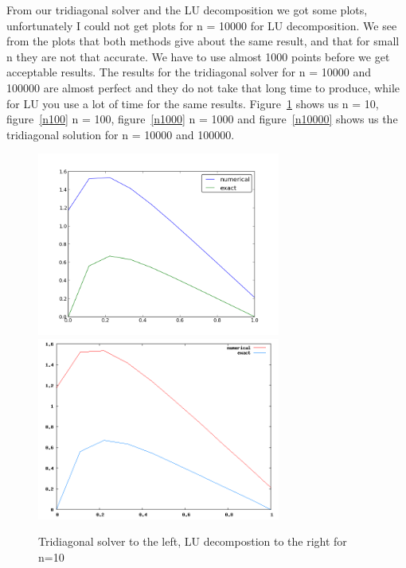 \documentclass[12pt,a4wide]{article}
\begin{document}
From our tridiagonal solver and the LU decomposition we got some plots, unfortunately I could not get plots for n = 10000 for LU decomposition.
We see from the plots that both methods give about the same result, and that for small n they are not that accurate. We have to use almost 1000 points before
we get acceptable results. The results for the tridiagonal solver for n = 10000 and 100000 are almost perfect and they do not take that long time to produce, 
while for LU you use a lot of time for the same results. Figure~\ref{n10} shows us n = 10,  figure~\ref{n100} n = 100, figure~\ref{n1000} n = 1000 and figure~\ref{n10000} shows us the tridiagonal solution for n = 10000 and 100000.
\begin{figure}
	\includegraphics[width=8cm]{project1n10}
	\includegraphics[width=8cm]{LUn10}
	\caption{Tridiagonal solver to the left, LU decompostion to the right for n=10}
	\label{n10}
\end{figure}
\end{document}
